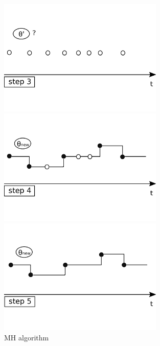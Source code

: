 \begin{figure}[H]
\begin{minipage}[!hp]{0.45\linewidth}
    \vspace{-0 in}
  \end{minipage}
  \begin{minipage}[!hp]{0.45\linewidth}
  \centering
    \includegraphics [width=0.70\textwidth, angle=0]{figs/plotn3.pdf}
    \vspace{-0 in}
  \end{minipage}
  \begin{minipage}[!hp]{0.45\linewidth}
  \centering
    \includegraphics [width=0.70\textwidth, angle=0]{figs/plotn4.pdf}
    \vspace{-0 in}
  \end{minipage}
  \begin{minipage}[!hp]{0.45\linewidth}
  \centering
    \includegraphics [width=0.70\textwidth, angle=0]{figs/plotn5.pdf}
    \vspace{-0 in}
  \end{minipage}
    \caption{MH algorithm}

  \end{figure}

